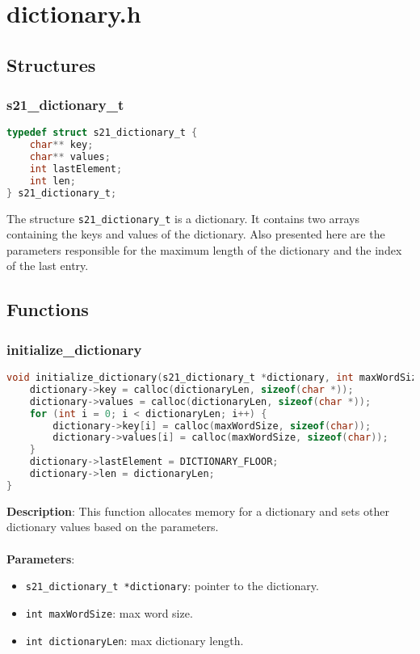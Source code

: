 \documentclass{article}
\begin{document}
\section{dictionary.h}
\subsection{Structures}
\subsubsection{s21\_dictionary\_t}
\begin{lstlisting}[language=C]
typedef struct s21_dictionary_t {
    char** key;
    char** values;
    int lastElement;
    int len;
} s21_dictionary_t;
\end{lstlisting}
The structure \texttt{s21\_dictionary\_t} is a dictionary. It contains two arrays containing the keys and values of the dictionary. Also presented here are the parameters responsible for the maximum length of the dictionary and the index of the last entry.
\subsection{Functions}

\subsubsection{initialize\_dictionary}
\begin{lstlisting}[language=C]
void initialize_dictionary(s21_dictionary_t *dictionary, int maxWordSize, int dictionaryLen) {
    dictionary->key = calloc(dictionaryLen, sizeof(char *));
    dictionary->values = calloc(dictionaryLen, sizeof(char *));
    for (int i = 0; i < dictionaryLen; i++) {
        dictionary->key[i] = calloc(maxWordSize, sizeof(char));
        dictionary->values[i] = calloc(maxWordSize, sizeof(char));
    }
    dictionary->lastElement = DICTIONARY_FLOOR;
    dictionary->len = dictionaryLen;
}
\end{lstlisting}
\noindent
\textbf{Description}: This function allocates memory for a dictionary and sets other dictionary values based on the parameters.\\\\
\textbf{Parameters}:
\begin{itemize}
    \item \texttt{s21\_dictionary\_t *dictionary}: pointer to the dictionary.
    \item \texttt{int maxWordSize}: max word size.
    \item \texttt{int dictionaryLen}: max dictionary length.
\end{itemize}
\end{document}
